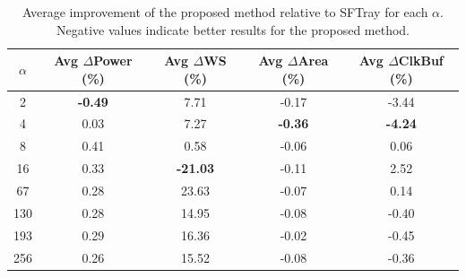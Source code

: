 \begin{table}[t]
\centering
\caption{Average improvement of the proposed method relative to SFTray for each $\alpha$. Negative values indicate better results for the proposed method.}
\label{tab:alpha_summary}
\begin{tabular}{c|cccc}
\toprule
$\alpha$ & Avg $\Delta$Power (\%) & Avg $\Delta$WS (\%) & Avg $\Delta$Area (\%) & Avg $\Delta$ClkBuf (\%) \\
\midrule
2 & \textbf{-0.49} & 7.71 & -0.17 & -3.44 \\
4 & 0.03 & 7.27 & \textbf{-0.36} & \textbf{-4.24} \\
8 & 0.41 & 0.58 & -0.06 & 0.06 \\
16 & 0.33 & \textbf{-21.03} & -0.11 & 2.52 \\
67 & 0.28 & 23.63 & -0.07 & 0.14 \\
130 & 0.28 & 14.95 & -0.08 & -0.40 \\
193 & 0.29 & 16.36 & -0.02 & -0.45 \\
256 & 0.26 & 15.52 & -0.08 & -0.36 \\
\bottomrule
\end{tabular}
\end{table}